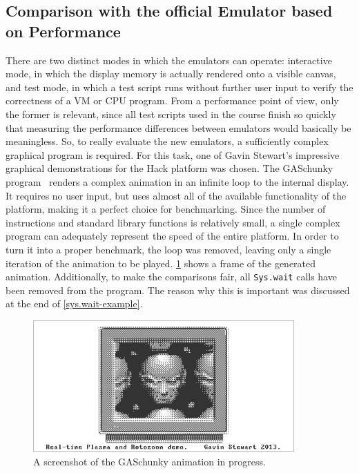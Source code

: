 
\subsection{Comparison with the official Emulator based on Performance} \label{sec:benchmarks}
There are two distinct modes in which the emulators can operate: interactive mode, in which the display memory is actually rendered onto a visible canvas, and test mode, in which a test script runs without further user input to verify the correctness of a VM or CPU program.
From a performance point of view, only the former is relevant, since all test scripts used in the course finish so quickly that measuring the performance differences between emulators would basically be meaningless.
So, to really evaluate the new emulators, a sufficiently complex graphical program is required.
For this task, one of Gavin Stewart's impressive graphical demonstrations for the Hack platform was chosen.
The GASchunky program~\cite{demos} renders a complex animation in an infinite loop to the internal display.
It requires no user input, but uses almost all of the available functionality of the platform, making it a perfect choice for benchmarking.
Since the number of instructions and standard library functions is relatively small, a single complex program can adequately represent the speed of the entire platform.
In order to turn it into a proper benchmark, the loop was removed, leaving only a single iteration of the animation to be played.
\cref{fig:gaschunky-screenshot} shows a frame of the generated animation.
Additionally, to make the comparisons fair, all \verb+Sys.wait+ calls have been removed from the program.
The reason why this is important was discussed at the end of \cref{sys.wait-example}.
\begin{center}
  \begin{figure}[ht]
    \centering
    \includegraphics[width=10cm]{fig/gaschunky.png}
    \caption{A screenshot of the GASchunky animation in progress.}%
    \label{fig:gaschunky-screenshot}
  \end{figure}
\end{center}
